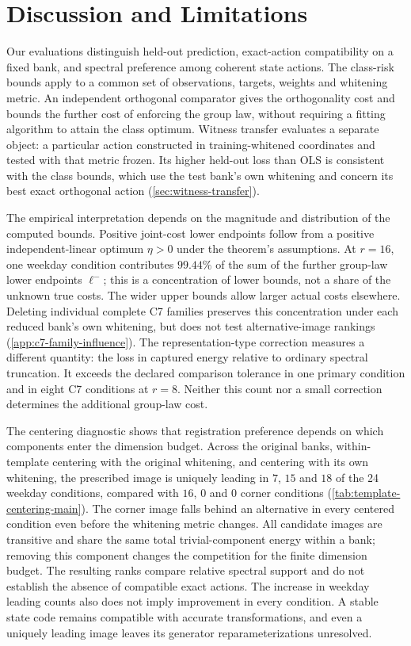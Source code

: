 \section{Discussion and Limitations}
\label{sec:reading-protocol}
Our evaluations distinguish held-out prediction, exact-action compatibility on a fixed bank, and spectral preference among coherent state actions.
The class-risk bounds apply to a common set of observations, targets, weights and whitening metric.
An independent orthogonal comparator gives the orthogonality cost and bounds the further cost of enforcing the group law, without requiring a fitting algorithm to attain the class optimum.
Witness transfer evaluates a separate object: a particular action constructed in training-whitened coordinates and tested with that metric frozen.
Its higher held-out loss than OLS is consistent with the class bounds, which use the test bank's own whitening and concern its best exact orthogonal action (\cref{sec:witness-transfer}).

The empirical interpretation depends on the magnitude and distribution of the computed bounds.
Positive joint-cost lower endpoints follow from a positive independent-linear optimum $\eta>0$ under the theorem's assumptions.
At $r=16$, one weekday condition contributes $99.44\%$ of the sum of the further group-law lower endpoints $\ell^-$; this is a concentration of lower bounds, not a share of the unknown true costs.
The wider upper bounds allow larger actual costs elsewhere.
Deleting individual complete C7 families preserves this concentration under each reduced bank's own whitening, but does not test alternative-image rankings (\cref{app:c7-family-influence}).
The representation-type correction measures a different quantity: the loss in captured energy relative to ordinary spectral truncation.
It exceeds the declared comparison tolerance in one primary condition and in eight C7 conditions at $r=8$.
Neither this count nor a small correction determines the additional group-law cost.

The centering diagnostic shows that registration preference depends on which components enter the dimension budget.
Across the original banks, within-template centering with the original whitening, and centering with its own whitening, the prescribed image is uniquely leading in $7$, $15$ and $18$ of the 24 weekday conditions, compared with $16$, $0$ and $0$ corner conditions (\cref{tab:template-centering-main}).
The corner image falls behind an alternative in every centered condition even before the whitening metric changes.
All candidate images are transitive and share the same total trivial-component energy within a bank; removing this component changes the competition for the finite dimension budget.
The resulting ranks compare relative spectral support and do not establish the absence of compatible exact actions.
The increase in weekday leading counts also does not imply improvement in every condition.
A stable state code remains compatible with accurate transformations, and even a uniquely leading image leaves its generator reparameterizations unresolved.

